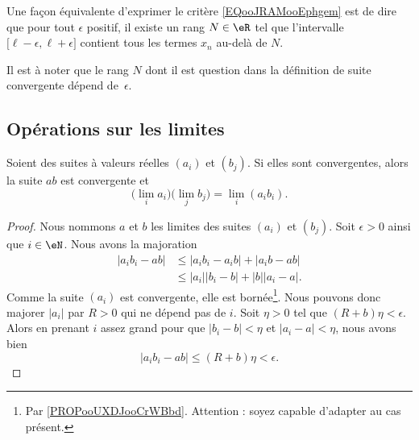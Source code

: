 Une façon équivalente d'exprimer le critère \eqref{EQooJRAMooEphgem} est de dire que pour tout \( \epsilon\) positif, il existe un rang \( N\in\eR\) tel que l'intervalle \( \mathopen[ \ell-\epsilon , \ell+\epsilon \mathclose]\) contient tous les termes \( x_n\) au-delà de \( N\).

Il est à noter que le rang \( N\) dont il est question dans la définition de suite convergente dépend de~\( \epsilon\).

\subsection{Opérations sur les limites}

\begin{proposition}     \label{PROPooIQOAooJPMoDD}
	Soient des suites à valeurs réelles \( (a_i)\) et \( (b_j)\). Si elles sont convergentes, alors la suite \( ab\) est convergente et
	\begin{equation}
		\big( \lim_ia_i \big)\big( \lim_jb_j \big)=\lim_i(a_ib_i).
	\end{equation}
\end{proposition}

\begin{proof}
	Nous nommons \( a\) et \( b\) les limites des suites \( (a_i)\) et \( (b_j)\). Soit \( \epsilon>0\) ainsi que \( i\in \eN\). Nous avons la majoration
	\begin{subequations}
		\begin{align}
			| a_ib_i-ab | & \leq | a_ib_i-a_ib |  + | a_ib-ab |      \\
			              & \leq | a_i | |b_i-b | + | b | | a_i-a |.
		\end{align}
	\end{subequations}
	Comme la suite \( (a_i)\) est convergente, elle est bornée\footnote{Par \ref{PROPooUXDJooCrWBbd}. Attention : soyez capable d'adapter au cas présent.}. Nous pouvons donc majorer \( | a_i |\) par \( R>0\) qui ne dépend pas de \( i\). Soit \( \eta>0\) tel que \( (R+b)\eta<\epsilon\). Alors en prenant \( i\) assez grand pour que \( | b_i-b |<\eta\) et \( | a_i-a |<\eta\), nous avons bien
	\begin{equation}
		| a_ib_i-ab |\leq (R+b)\eta<\epsilon.
	\end{equation}
\end{proof}

